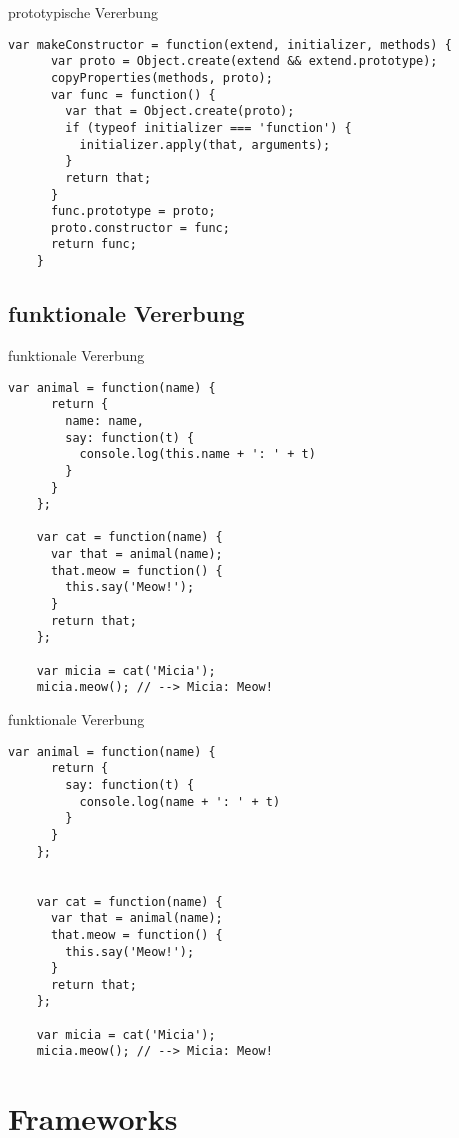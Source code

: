 \begin{frame}[fragile]{prototypische Vererbung}
  \begin{lstlisting}[gobble=4]
    var makeConstructor = function(extend, initializer, methods) {
      var proto = Object.create(extend && extend.prototype);
      copyProperties(methods, proto);
      var func = function() {
        var that = Object.create(proto);
        if (typeof initializer === 'function') {
          initializer.apply(that, arguments);
        }
        return that;
      }
      func.prototype = proto;
      proto.constructor = func;
      return func;
    }
  \end{lstlisting}
\end{frame}

\subsection{funktionale Vererbung}

\begin{frame}[fragile]{funktionale Vererbung}
  \begin{lstlisting}[gobble=4]
    var animal = function(name) {
      return {
        name: name,
        say: function(t) {
          console.log(this.name + ': ' + t)
        }
      }
    };
    
    var cat = function(name) {
      var that = animal(name);
      that.meow = function() {
        this.say('Meow!');
      }
      return that;
    };
    
    var micia = cat('Micia');
    micia.meow(); // --> Micia: Meow!
  \end{lstlisting}
\end{frame}

\begin{frame}[fragile]{funktionale Vererbung}
  \begin{lstlisting}[gobble=4]
    var animal = function(name) {
      return {
        say: function(t) {
          console.log(name + ': ' + t)
        }
      }
    };

    
    var cat = function(name) {
      var that = animal(name);
      that.meow = function() {
        this.say('Meow!');
      }
      return that;
    };
    
    var micia = cat('Micia');
    micia.meow(); // --> Micia: Meow!
  \end{lstlisting}
\end{frame}

\section{Frameworks}

